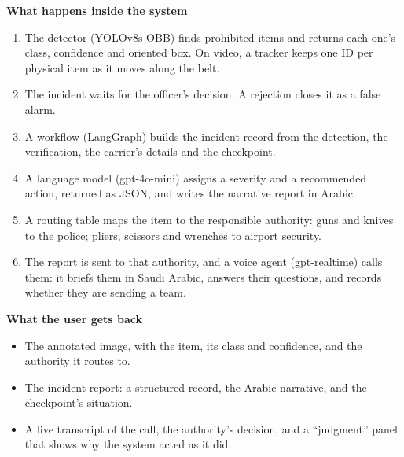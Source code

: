\documentclass[11pt,a4paper]{article}
\begin{document}
\textbf{What happens inside the system}
\begin{enumerate}
  \item The detector (YOLOv8s-OBB) finds prohibited items and returns each one's class, confidence
        and oriented box. On video, a tracker keeps one ID per physical item as it moves along the
        belt.
  \item The incident waits for the officer's decision. A rejection closes it as a false alarm.
  \item A workflow (LangGraph) builds the incident record from the detection, the verification, the
        carrier's details and the checkpoint.
  \item A language model (gpt-4o-mini) assigns a severity and a recommended action, returned as
        JSON, and writes the narrative report in Arabic.
  \item A routing table maps the item to the responsible authority: guns and knives to the police;
        pliers, scissors and wrenches to airport security.
  \item The report is sent to that authority, and a voice agent (gpt-realtime) calls them: it
        briefs them in Saudi Arabic, answers their questions, and records whether they are sending
        a team.
\end{enumerate}

\textbf{What the user gets back}
\begin{itemize}
  \item The annotated image, with the item, its class and confidence, and the authority it routes to.
  \item The incident report: a structured record, the Arabic narrative, and the checkpoint's
        situation.
  \item A live transcript of the call, the authority's decision, and a ``judgment'' panel that shows
        why the system acted as it did.
\end{itemize}
\end{document}
